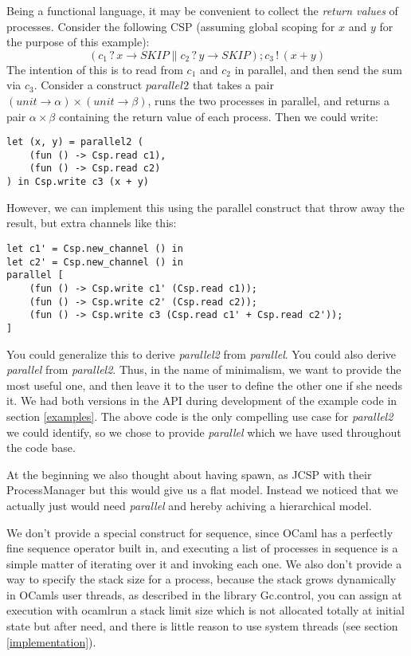 \documentclass[a4paper,12pt]{article}
\begin{document}
Being a functional language, it may be convenient to collect the \emph{return
values} of processes. Consider the following CSP (assuming global scoping for
$x$ and $y$ for the purpose of this example):
\[(c_1\,?\,x \to SKIP \parallel c_2\,?\,y \to SKIP); c_3\,!\,(x + y)\]
The intention of this is to read from $c_1$ and $c_2$ in parallel, and then
send the sum via $c_3$. Consider a construct $parallel2$ that takes a pair 
$(unit \to \alpha) \times (unit \to \beta)$, runs the two processes in parallel,
and returns a pair $\alpha \times \beta$ containing the return value of each
process. Then we could write:

\begin{verbatim}
let (x, y) = parallel2 (
    (fun () -> Csp.read c1), 
    (fun () -> Csp.read c2)
) in Csp.write c3 (x + y)
\end{verbatim}

However, we can implement this using the parallel construct that throw away
the result, but extra channels like this:

\begin{verbatim}
let c1' = Csp.new_channel () in
let c2' = Csp.new_channel () in
parallel [
    (fun () -> Csp.write c1' (Csp.read c1));
    (fun () -> Csp.write c2' (Csp.read c2));
    (fun () -> Csp.write c3 (Csp.read c1' + Csp.read c2'));
]
\end{verbatim}

You could generalize this to derive \emph{parallel2} from \emph{parallel}. You
could also derive \emph{parallel} from \emph{parallel2}. Thus, in the name of
minimalism, we want to provide the most useful one, and then leave it to the
user to define the other one if she needs it. We had both versions in the API
during development of the example code in section \ref{examples}. The above code
is the only compelling use case for \emph{parallel2} we could identify, so we
chose to provide \emph{parallel} which we have used throughout the code base.

At the beginning we also thought about having spawn, as JCSP with their
ProcessManager but this would give us a flat model. Instead we noticed that we
actually just would need {\it parallel} and hereby achiving a hierarchical
model.

We don't provide a special construct for sequence, since OCaml has a perfectly
fine sequence operator built in, and executing a list of processes in sequence
is a simple matter of iterating over it and invoking each one. We also don't
provide a way to specify the stack size for a process, because the stack grows
dynamically in OCamls user threads, as described in the library Gc.control, you
can assign at execution with ocamlrun a stack limit size which is not allocated
totally at initial state but after need, and there is little reason to use
system threads (see section \ref{implementation}).
\end{document}

